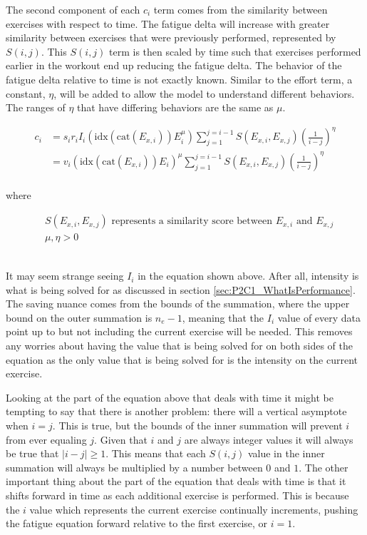 The second component of each $c_i$ term comes from the similarity between exercises with respect to time. The fatigue delta will increase with greater similarity between exercises that were previously performed, represented by $S(i,j)$. This $S(i,j)$ term is then scaled by time such that exercises performed earlier in the workout end up reducing the fatigue delta. The behavior of the fatigue delta relative to time is not exactly known. Similar to the effort term, a constant, $\eta$, will be added to allow the model to understand different behaviors. The ranges of $\eta$ that have differing behaviors are the same as $\mu$.

\begin{minipage}{\textwidth}
	\begin{equation*}
		\begin{split}
			c_i & = 
			s_i r_i I_i \left(
				\text{idx}(\text{cat}(E_{x,i})) E_i^\mu 
			\right) \sum_{j=1}^{j=i-1} S(E_{x,i},E_{x,j})\left(
				\frac{1}{i-j}
			\right)^\eta
			\\
			& =
			v_i \left(
				\text{idx}(\text{cat}(E_{x,i})) E_i
			\right) ^\mu \sum_{j=1}^{j=i-1} S(E_{x,i},E_{x,j})\left(
				\frac{1}{i-j}
			\right)^\eta
			\\
		\end{split}
	\end{equation*}
	\centerline{where}
	\begin{equation*}
		\begin{split}
			& S(E_{x,i},E_{x,j}) \text{ represents a similarity score between } E_{x,i} \text{ and } E_{x,j} \\
			& \mu, \eta>0
		\end{split}
	\end{equation*}
\end{minipage}\\

It may seem strange seeing $I_i$ in the equation shown above. After all, intensity is what is being solved for as discussed in section \ref{sec:P2C1_WhatIsPerformance}. The saving nuance comes from the bounds of the summation, where the upper bound on the outer summation is $n_e-1$, meaning that the $I_i$ value of every data point up to but not including the current exercise will be needed. This removes any worries about having the value that is being solved for on both sides of the equation as the only value that is being solved for is the intensity on the current exercise.

Looking at the part of the equation above that deals with time it might be tempting to say that there is another problem: there will a vertical asymptote when $i=j$. This is true, but the bounds of the inner summation will prevent $i$ from ever equaling $j$. Given that $i$ and $j$ are always integer values it will always be true that $|i-j|\ge1$. This means that each $S(i,j)$ value in the inner summation will always be multiplied by a number between $0$ and $1$. The other important thing about the part of the equation that deals with time is that it shifts forward in time as each additional exercise is performed. This is because the $i$ value which represents the current exercise continually increments, pushing the fatigue equation forward relative to the first exercise, or $i=1$.

